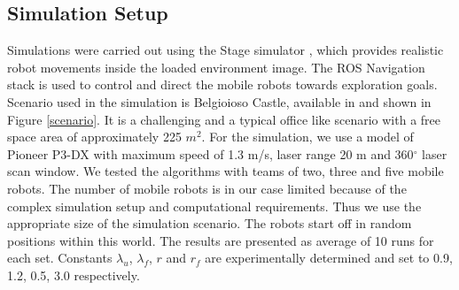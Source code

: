 \subsection{Simulation Setup}
Simulations were carried out using the Stage simulator \cite{stageweb}, which provides realistic robot movements inside the loaded environment image. The ROS Navigation stack is used to control and direct the mobile robots towards exploration goals. 
Scenario used in the simulation is Belgioioso Castle, available in \cite{fr_dataset} and shown in Figure \ref{scenario}. It is a challenging and a typical office like scenario with a free space area of approximately 225 ${m}^2$. For the simulation, we use a model of Pioneer P3-DX with maximum speed of 1.3 m/s, laser range 20 m and 360$^{\circ}$ laser scan window. 
We tested the algorithms with teams of two, three and five mobile robots. The number of mobile robots is in our case limited because of the complex simulation setup and computational requirements. Thus we use the appropriate size of the simulation scenario. The robots start off in random positions within this world. The results are presented as average of 10 runs for each set. Constants $\lambda_{u}$, $\lambda_{f}$, $r$ and $r_{f}$ are experimentally determined and set to  0.9, 1.2, 0.5, 3.0 respectively.

